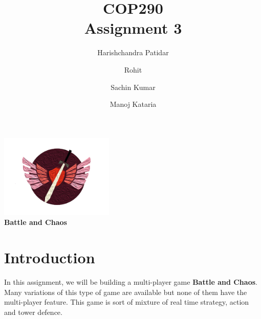 \documentclass{article}
\title{COP290\\Assignment 3}
\author{Harishchandra Patidar\and Rohit\and Sachin Kumar\and Manoj Kataria}
\begin{document}
\maketitle
\begin{center}
\includegraphics[height=4cm]{icon.png}\\
\textbf{Battle and Chaos}
\end{center}
\newpage
\tableofcontents
\newpage

\section{Introduction}

In this assignment, we will be building a multi-player game \textbf{Battle and Chaos}. Many variations of this type of game are available but none of them have the multi-player feature. This game is sort of mixture of real time strategy, action and tower defence.
\end{document}
